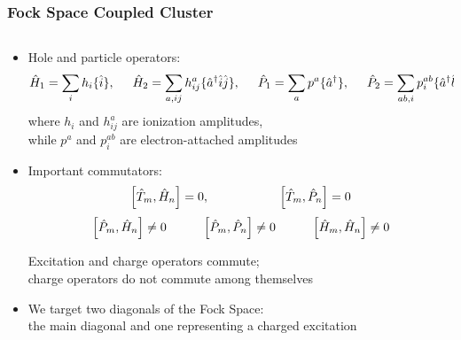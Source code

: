 \documentclass[aspectratio=169,9pt]{beamer}
\begin{document}
\begin{frame}
\frametitle{Fock Space Coupled Cluster}

        \begin{columns}
        \begin{column}{0.80\textwidth}
\begin{itemize}
\item 
Hole and particle operators:
\vspace{3mm}
\[
\hat{H}_{1}= \sum_{i}h_{i} \{\hat{i}\},\hspace{5mm} \hat{H}_{2}= \sum_{a,ij}h^{a}_{ij} \{\hat{a}^{\dagger}\hat{i}\hat{j}\},\hspace{5mm}\hat{P}_{1}= \sum_{a}p^{a}\{\hat{a}^{\dagger}\}, \hspace{5mm} \hat{P}_{2}= \sum_{ab,i}p^{ab}_{i} \{\hat{a}^{\dagger}\hat{b}^{\dagger}\hat{i}\}
\]
where  $h_{i}$ and $h^{a}_{ij}$ are ionization amplitudes, \\ while $p^{a}$ and $p^{ab}_{i}$ are electron-attached amplitudes

\item 
Important commutators:
\[
\left[ \hat{T}_{m},\hat{H}_{n} \right]=0, \hspace{20mm} \left[ \hat{T}_{m},\hat{P}_{n} \right]=0
\]
\[
\left[ \hat{P}_{m},\hat{H}_{n} \right] \neq 0 \hspace{10mm}   \left[ \hat{P}_{m},\hat{P}_{n} \right] \neq 0 \hspace{10mm}   \left[ \hat{H}_{m},\hat{H}_{n} \right] \neq 0
\]

Excitation and charge operators commute; \\ charge operators do not commute among themselves

\item 
We target two diagonals of the Fock Space: \\ the main diagonal and one representing a charged excitation
\end{itemize}
        \end{column}


\end{columns}
\end{frame}
\end{document}
